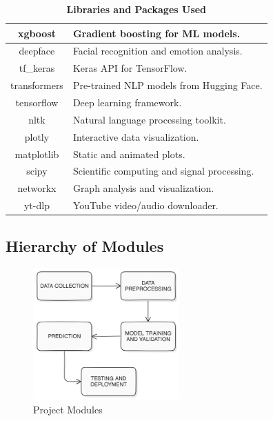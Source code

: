 \begin{table}[H]
\begin{tabular}{|c|p{12cm}|}
        \hline
        xgboost & Gradient boosting for ML models. \\
        \hline
        deepface & Facial recognition and emotion analysis. \\
        \hline
        tf\_keras & Keras API for TensorFlow. \\
        \hline
        transformers & Pre-trained NLP models from Hugging Face. \\
        \hline
        tensorflow & Deep learning framework. \\
        \hline
        nltk & Natural language processing toolkit. \\
        \hline
        plotly & Interactive data visualization. \\
        \hline 
        matplotlib & Static and animated plots. \\
        \hline
        scipy & Scientific computing and signal processing. \\
        \hline
        networkx & Graph analysis and visualization. \\
        \hline
        yt-dlp & YouTube video/audio downloader. \\
        \hline
    \end{tabular}
    \caption*{\textbf{Libraries and Packages Used}}
    \label{tab:libraries}
\end{table}

\pagebreak

\subsection{Hierarchy of Modules}
\begin{figure}[h!]  
    \centering
    \includegraphics[width=0.5\textwidth]{Images/Project Modules.png}  
    \caption*{Project Modules}
    \label{Project Modules}  %
\end{figure}

